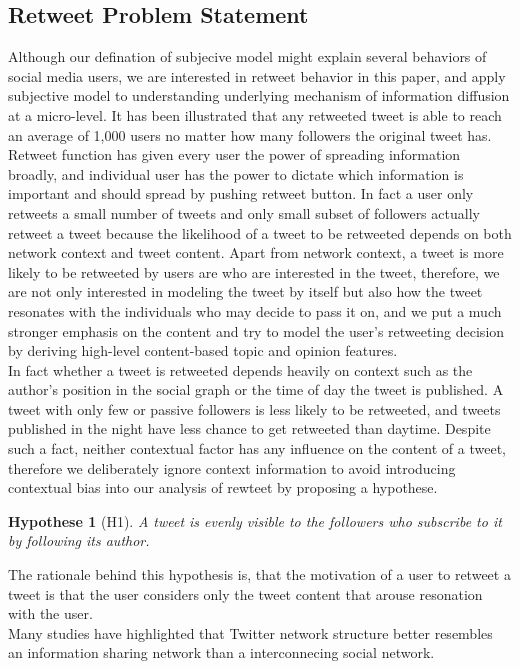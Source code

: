 \documentclass{acm_proc_article-sp}
\newtheorem{hypothese}{Hypothese}
\begin{document}
\subsection{Retweet Problem Statement}
Although our defination of subjecive model might explain several behaviors of social media users, we are interested in retweet behavior in this paper, and apply subjective model to understanding underlying mechanism of information diffusion at a micro-level. 
It has been illustrated that any retweeted tweet is able to reach an average of 1,000 users no matter how many followers the original tweet has\cite{Kwak:2010TSN}.
Retweet function has given every user the power of spreading information broadly, and individual user has the power to dictate which information is important and should spread by pushing retweet button. 
In fact a user only retweets a small number of tweets and only small subset of followers actually retweet a tweet because the likelihood of a tweet to be retweeted depends on both network context and tweet content. 
Apart from network context, a tweet is more likely to be retweeted by users are who are interested in the tweet, therefore, we are not only interested in modeling the tweet by itself but also how the tweet resonates with the individuals who may decide to pass it on, and we put a much stronger emphasis on the content and try to model the user's retweeting decision by deriving high-level content-based topic and opinion features. \\
In fact whether a tweet is retweeted depends heavily on context such as the author's position in the social graph or the time of day the tweet is published. 
A tweet with only few or passive followers is less likely to be retweeted, and tweets published in the night have less chance to get retweeted than daytime. 
Despite such a fact, neither contextual factor has any influence on the content of a tweet, therefore we deliberately ignore context information to avoid introducing contextual bias into our analysis of rewteet by proposing a hypothese.
\begin{hypothese}[H1]
A tweet is evenly visible to the followers who subscribe to it by following its author.
\end{hypothese}
The rationale behind this hypothesis is, that the motivation of a user to retweet a tweet is that the user considers only the tweet content that arouse resonation with the user.\\
Many studies have highlighted that Twitter network structure better resembles an information sharing network than a interconnecing social network\cite{Boyd2010,Kwak:2010TSN}. 
\end{document}
